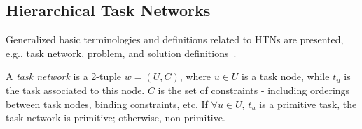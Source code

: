 \documentclass[letterpaper]{article} %
\newtheorem{definition}{Definition}
\begin{document}





\subsection{Hierarchical Task Networks}
Generalized basic terminologies and definitions related to HTNs are presented, e.g., task network, problem, and solution definitions~\cite{naubooks0014222}.  

A \textit{task network} is a 2-tuple $w=(U,C)$, where $u\in U$ is a task node, while $t_u$ is the task associated to this node. $C$ is the set of constraints - including orderings between task nodes, binding constraints, etc. If $\forall u \in U$, $t_u$ is a primitive task, the task network is primitive; otherwise, non-primitive.
\end{document}
